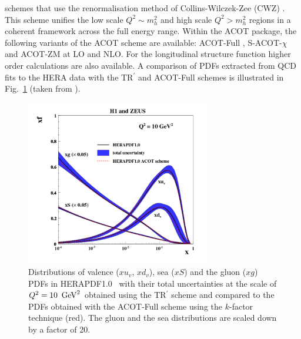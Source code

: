 \begin{itemize}
schemes that use the renormalisation method of Collins-Wilczek-Zee (CWZ) \cite{CWZ}.
This scheme unifies the low scale $Q^2 \sim m_h^2$ and high scale $Q^2 > m_h^2$ regions
in a coherent framework across the full energy range.
%
Within the ACOT package, the following variants of the ACOT scheme are available:
ACOT-Full \cite{Aivazis:1993pi}, S-ACOT-$\chi$ \cite{Kramer:2000hn,Kretzer:2003it} and ACOT-ZM \cite{Aivazis:1993pi}
at LO and NLO. 
For the longitudinal structure function higher order calculations are also available. 
A comparison of PDFs extracted from QCD fits to the HERA data 
with the TR$^\prime$ and ACOT-Full schemes is illustrated in Fig.~\ref{fig:acotrt} (taken from \cite{h1zeus:2009wt}).

\begin{figure}[!ht]
\centering
\includegraphics[width=8cm]{heraacot}
   \caption{Distributions of valence ($xu_v$, $xd_v$), sea ($xS$) and the gluon ($xg$) PDFs in HERAPDF1.0~\cite{h1zeus:2009wt}
       with their total uncertainties at the scale of $Q^2 = 10\ \,\text{Ge\hspace{-.08em}V}^2$ obtained 
       using the TR$^\prime$ scheme and compared to the PDFs obtained with 
       the ACOT-Full scheme using the $k$-factor technique (red).
       The gluon and the sea distributions are scaled down by a factor of 20.}
 \label{fig:acotrt}
\end{figure}


\end{itemize}

